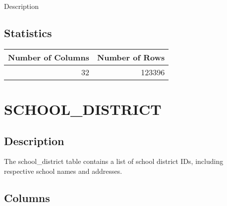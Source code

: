 \documentclass[
  letterpaper,
  DIV=11,
  numbers=noendperiod]{scrreprt}
\begin{document}
Description

\hypertarget{statistics-34}{%
\section*{Statistics}\label{statistics-34}}

\begin{longtable}{rr}
\toprule
Number of Columns & Number of Rows \\ 
\midrule
32 & 123396 \\ 
\bottomrule
\end{longtable}

\hypertarget{school_district}{%
\chapter*{SCHOOL\_DISTRICT}\label{school_district}}

\hypertarget{description-35}{%
\section*{Description}\label{description-35}}

The school\_district table contains a list of school district IDs,
including respective school names and addresses.

\hypertarget{columns-35}{%
\section*{Columns}\label{columns-35}}
\end{document}
